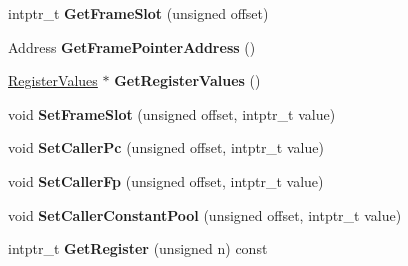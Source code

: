 \begin{DoxyCompactItemize}
\item 
intptr\+\_\+t {\bfseries Get\+Frame\+Slot} (unsigned offset)\hypertarget{classv8_1_1internal_1_1_frame_description_ad0706670dac1b0c2b6452eff67946d1e}{}\label{classv8_1_1internal_1_1_frame_description_ad0706670dac1b0c2b6452eff67946d1e}

\item 
Address {\bfseries Get\+Frame\+Pointer\+Address} ()\hypertarget{classv8_1_1internal_1_1_frame_description_a79bb0c147523c8421ce78b4b145fee01}{}\label{classv8_1_1internal_1_1_frame_description_a79bb0c147523c8421ce78b4b145fee01}

\item 
\hyperlink{classv8_1_1internal_1_1_register_values}{Register\+Values} $\ast$ {\bfseries Get\+Register\+Values} ()\hypertarget{classv8_1_1internal_1_1_frame_description_a956c00ed5647e3bed4ae198ea13e2470}{}\label{classv8_1_1internal_1_1_frame_description_a956c00ed5647e3bed4ae198ea13e2470}

\item 
void {\bfseries Set\+Frame\+Slot} (unsigned offset, intptr\+\_\+t value)\hypertarget{classv8_1_1internal_1_1_frame_description_aee24b65bf66e1559372f8b386a91e66a}{}\label{classv8_1_1internal_1_1_frame_description_aee24b65bf66e1559372f8b386a91e66a}

\item 
void {\bfseries Set\+Caller\+Pc} (unsigned offset, intptr\+\_\+t value)\hypertarget{classv8_1_1internal_1_1_frame_description_ad6f98224311b82550cadc0b9f43ecb57}{}\label{classv8_1_1internal_1_1_frame_description_ad6f98224311b82550cadc0b9f43ecb57}

\item 
void {\bfseries Set\+Caller\+Fp} (unsigned offset, intptr\+\_\+t value)\hypertarget{classv8_1_1internal_1_1_frame_description_a4df1a37c3cbc09409320c6b82cb2e36b}{}\label{classv8_1_1internal_1_1_frame_description_a4df1a37c3cbc09409320c6b82cb2e36b}

\item 
void {\bfseries Set\+Caller\+Constant\+Pool} (unsigned offset, intptr\+\_\+t value)\hypertarget{classv8_1_1internal_1_1_frame_description_a6805273bc3d1f3e6cd2289fb93a007ce}{}\label{classv8_1_1internal_1_1_frame_description_a6805273bc3d1f3e6cd2289fb93a007ce}

\item 
intptr\+\_\+t {\bfseries Get\+Register} (unsigned n) const \hypertarget{classv8_1_1internal_1_1_frame_description_a464042607a8ecfac1ab8828b5b4e07aa}{}\label{classv8_1_1internal_1_1_frame_description_a464042607a8ecfac1ab8828b5b4e07aa}


\end{DoxyCompactItemize}
